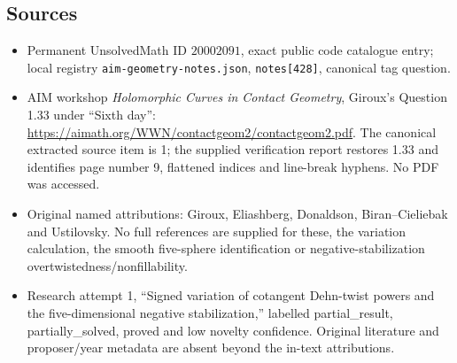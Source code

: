 \documentclass[11pt]{article}
\begin{document}
\subsection{Sources}
\begin{itemize}
\item Permanent UnsolvedMath ID \(20002091\), exact public code catalogue entry; local registry \texttt{aim-geometry-notes.json}, \texttt{notes[428]}, canonical tag question.
\item AIM workshop \emph{Holomorphic Curves in Contact Geometry}, Giroux's Question 1.33 under ``Sixth day'': \url{https://aimath.org/WWN/contactgeom2/contactgeom2.pdf}. The canonical extracted source item is 1; the supplied verification report restores 1.33 and identifies page number 9, flattened indices and line-break hyphens. No PDF was accessed.
\item Original named attributions: Giroux, Eliashberg, Donaldson, Biran--Cieliebak and Ustilovsky. No full references are supplied for these, the variation calculation, the smooth five-sphere identification or negative-stabilization overtwistedness/nonfillability.
\item Research attempt 1, ``Signed variation of cotangent Dehn-twist powers and the five-dimensional negative stabilization,'' labelled partial\_result, partially\_solved, proved and low novelty confidence. Original literature and proposer/year metadata are absent beyond the in-text attributions.
\end{itemize}
\end{document}
